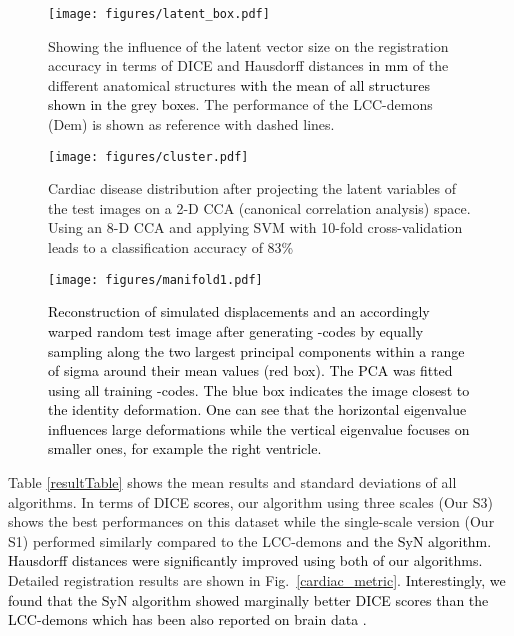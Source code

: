 \documentclass[journal]{IEEEtran}
\newcommand{\update}[1]{\textcolor{black}{#1}}
\begin{document}
\begin{figure}[tb]
\centering 
\texttt{[image: figures/latent\_box.pdf]}
\caption{\small{Showing the influence of the latent vector size  on the registration accuracy in terms of DICE and Hausdorff distances \update{in mm} of the different anatomical structures \update{with the mean of all structures shown in the grey boxes}. The performance of the LCC-demons (Dem) is shown as reference with dashed lines.}}\label{latent_code_analysis}
\end{figure}
\begin{figure}[tb]
\centering
\texttt{[image: figures/cluster.pdf]}
\caption{\small{Cardiac disease distribution after projecting the latent variables  of the test images on a 2-D CCA (canonical correlation analysis) space. Using an 8-D CCA and applying SVM with 10-fold cross-validation leads to a classification accuracy of 83\%}}\label{cluster}
\end{figure}
\begin{figure*}[tb]
\centering 
\texttt{[image: figures/manifold1.pdf]}
\caption{\textcolor{black}{\small{\update{Reconstruction of simulated displacements and an accordingly warped random test image after generating -codes by equally sampling along the two largest principal components within a range of  sigma around their mean values (red box). The PCA was fitted using all training -codes}. The blue box indicates the image closest to the identity deformation. One can see that the horizontal eigenvalue influences large deformations while the vertical eigenvalue focuses on smaller ones, for example the right ventricle.}}}\label{manifold}
\end{figure*}

Table \ref{resultTable} shows the mean results and standard deviations of all algorithms. In terms of DICE \update{scores}, our algorithm using three scales (Our S3) shows the best performances on this dataset while the single-scale version (Our S1) performed similarly compared to the LCC-demons \update{and the SyN algorithm. Hausdorff distances were significantly improved using both of our algorithms.} Detailed registration results are shown in Fig.~\ref{cardiac_metric}. \update{Interestingly, we found that the SyN algorithm showed marginally better DICE scores than the LCC-demons which has been also reported on brain data \cite{lorenzi2013lcc}.}
\end{document}
